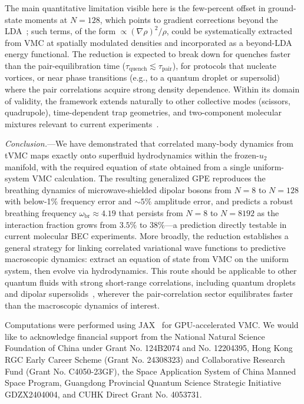 \documentclass[aps,prl,twocolumn,superscriptaddress,longbibliography]{revtex4-2}
\begin{document}
The main quantitative limitation visible here is the few-percent offset
in ground-state moments at $N=128$, which points to gradient corrections
beyond the LDA~\cite{Ancilotto2017}; such terms, of the form
$\propto(\nabla\rho)^2/\rho$, could be systematically extracted from
VMC at spatially modulated densities and incorporated as a beyond-LDA
energy functional.  The reduction is expected to break down for
quenches faster than the pair-equilibration time
($\tau_{\mathrm{quench}} \lesssim \tau_{\mathrm{pair}}$), for
protocols that nucleate vortices, or near phase transitions (e.g., to a
quantum droplet or supersolid) where the pair correlations acquire
strong density dependence.  Within its domain of validity, the
framework extends naturally to other collective modes (scissors,
quadrupole), time-dependent trap geometries, and two-component
molecular mixtures relevant to current
experiments~\cite{Bigagli2024,Lin2023,Duda2023}.

\emph{Conclusion.}---We have demonstrated that correlated many-body
dynamics from tVMC maps exactly onto superfluid hydrodynamics within the
frozen-$u_2$ manifold, with the required equation of state obtained from
a single uniform-system VMC calculation.  The resulting generalized GPE
reproduces the breathing dynamics of microwave-shielded dipolar bosons
from $N=8$ to $N=128$ with below-1\% frequency error and $\sim\!5\%$
amplitude error, and predicts a robust breathing frequency
$\omega_{\mathrm{br}} \approx 4.19$ that persists from $N=8$ to
$N=8192$ as the interaction fraction grows from $3.5\%$ to $38\%$---a
prediction directly testable in current molecular BEC experiments.
More broadly, the reduction establishes a general strategy for linking
correlated variational wave functions to predictive macroscopic
dynamics: extract an equation of state from VMC on the uniform system,
then evolve via hydrodynamics.  This route should be applicable to
other quantum fluids with strong short-range correlations, including
quantum droplets~\cite{Petrov2015,Bottcher2019} and dipolar
supersolids~\cite{Chomaz2023}, wherever the pair-correlation sector
equilibrates faster than the macroscopic dynamics of interest.

\begin{acknowledgments}
Computations were performed using JAX~\cite{Bradbury2018} for
GPU-accelerated VMC.
We would like to acknowledge financial support from the National Natural Science Foundation of China under Grant No. 124B2074 and No. 12204395, Hong Kong RGC Early Career Scheme (Grant No. 24308323) and Collaborative Research Fund (Grant No. C4050-23GF), the Space Application System of China Manned Space Program, Guangdong Provincial Quantum Science Strategic Initiative GDZX2404004, and CUHK Direct Grant No. 4053731.
\end{acknowledgments}


\end{document}
